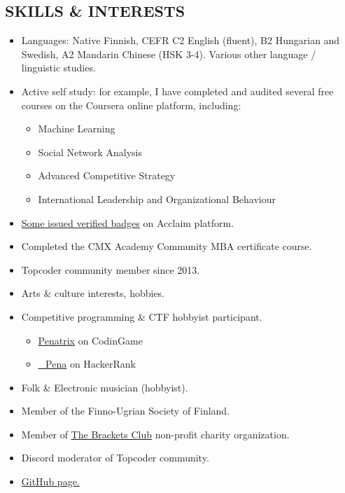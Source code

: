 \documentclass[margin, 10pt]{res} %
\begin{document}
\begin{resume}
\section{SKILLS \& INTERESTS}
\begin{itemize} \itemsep -2pt
\item Languages: Native Finnish, CEFR C2 English (fluent), B2 Hungarian and Swedish, A2 Mandarin Chinese (HSK 3-4). Various other language / linguistic studies.
\item Active self study: for example, I have completed and audited several free courses on the Coursera online platform, including:
  \begin{itemize} \itemsep -2pt
  \item Machine Learning
  \item Social Network Analysis
  \item Advanced Competitive Strategy
  \item International Leadership and Organizational Behaviour
  \end{itemize}
\item \href{https://www.youracclaim.com/users/pentti-sunila/badges}{Some issued verified badges} on Acclaim platform.
\item Completed the CMX Academy Community MBA certificate course.
\item Topcoder community member since 2013.
\item Arts \& culture interests, hobbies.
\item Competitive programming \& CTF hobbyist participant.
\begin{itemize}
	\item \href{https://www.codingame.com/profile/e3a213a1df3e0d739af5ddb7dbfe73a07564915}{Penatrix} on CodinGame
	\item \href{https://www.hackerrank.com/_Pena}{\_Pena} on HackerRank
\end{itemize}
\item Folk \& Electronic musician (hobbyist).
\item Member of the Finno-Ugrian Society of Finland.
\item Member of \href{https://thebracketsclub.com/}{The Brackets Club} non-profit charity organization.
\item Discord moderator of Topcoder community.
\item \href{https://github.com/gingerdeer}{GitHub page.}
\end{itemize}



\end{resume}
\end{document}
